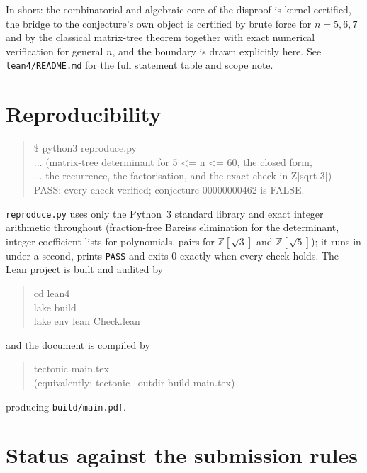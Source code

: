 \documentclass[11pt]{article}
\theoremstyle{definition}
\theoremstyle{remark}
\newcommand{\Z}{\mathbb{Z}}
\begin{document}
\noindent In short: the combinatorial and algebraic core of the disproof is
kernel-certified, the bridge to the conjecture's own object is certified by
brute force for $n = 5,6,7$ and by the classical matrix-tree theorem together
with exact numerical verification for general $n$, and the boundary is drawn
explicitly here.  See \texttt{lean4/README.md} for the full statement table and
scope note.

\section{Reproducibility}

\begin{quote}\ttfamily
\$ python3 reproduce.py\\
... (matrix-tree determinant for 5 <= n <= 60, the closed form,\\
... the recurrence, the factorisation, and the exact check in Z[sqrt 3])\\
PASS: every check verified; conjecture 00000000462 is FALSE.
\end{quote}

\texttt{reproduce.py} uses only the Python~3 standard library and exact integer
arithmetic throughout (fraction-free Bareiss elimination for the determinant,
integer coefficient lists for polynomials, pairs for $\Z[\sqrt3]$ and
$\Z[\sqrt5]$); it runs in under a second, prints \texttt{PASS} and exits $0$
exactly when every check holds. The Lean project is built and audited by

\begin{quote}\ttfamily
cd lean4\\
lake build\\
lake env lean Check.lean
\end{quote}

\noindent and the document is compiled by

\begin{quote}\ttfamily
tectonic main.tex\\
(equivalently: tectonic --outdir build main.tex)
\end{quote}

\noindent producing \texttt{build/main.pdf}.

\section{Status against the submission rules}
\end{document}
